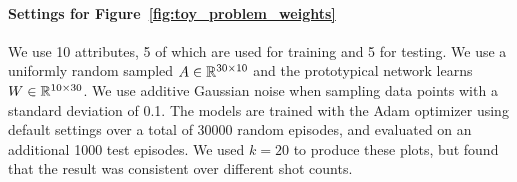 \paragraph{Settings for Figure~\ref{fig:toy_problem_weights}} We use 10 attributes, 5 of which are
used for training and 5 for testing. We use a uniformly random sampled $A\in\mathbb{R}^{30\times10}$ and
the prototypical network learns $W\in\mathbb{R}^{10\times30}$. We use additive Gaussian noise when
sampling data points with a standard deviation of 0.1. The models are trained with the Adam
optimizer using default settings over a total of 30000 random episodes, and evaluated on an
additional 1000 test episodes. We used $k=20$ to produce these plots, but found that the result was
consistent over different shot counts.
